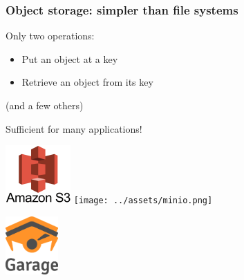 \documentclass[aspectratio=169]{beamer}
\begin{document}
\begin{frame}
	\frametitle{Object storage: simpler than file systems}

	\begin{minipage}{6cm}
		Only two operations:
		\vspace{1em}
		\begin{itemize}
			\item Put an object at a key
				\vspace{1em}
			\item Retrieve an object from its key
		\end{itemize}
		\vspace{1em}
		{\footnotesize (and a few others)}

		\vspace{1em}
		Sufficient for many applications!
	\end{minipage}
	\hfill
	\begin{minipage}{8cm}
		\begin{center}
			\vspace{2em}
			\includegraphics[height=6em]{../2020-12-02_wide-team/img/Amazon-S3.jpg}
			\hspace{2em}
			\texttt{[image: ../assets/minio.png]}

			\vspace{2em}
			\includegraphics[height=6em]{../../logo/garage_hires_crop.png}
		\end{center}
		\vspace{1em}
	\end{minipage}
\end{frame}
\end{document}
